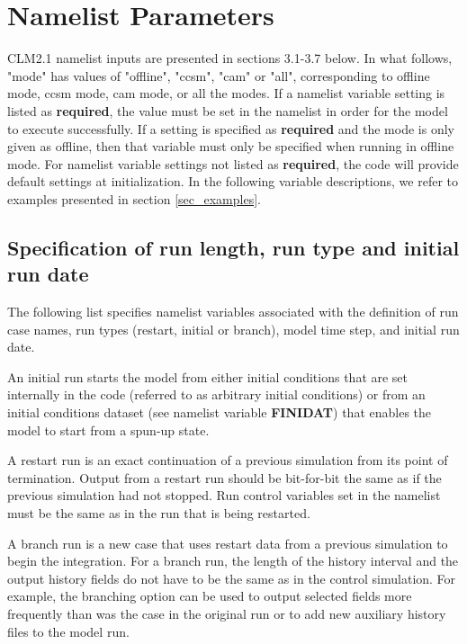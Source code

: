 \section{Namelist Parameters}
\label{sec_namelist}

CLM2.1 namelist inputs are presented in sections 3.1-3.7 below.
In what follows, "mode" has values of "offline", "ccsm", "cam" or "all",
corresponding to offline mode, ccsm mode, cam mode, or all the modes.
If a namelist variable setting is listed as {\bf required}, the
value must be set in the namelist in order for the model to execute
successfully.  If a setting is specified as {\bf required} and the
mode is only given as offline, then that variable must only be
specified when running in offline mode.  For namelist variable
settings not listed as {\bf required}, the code will provide default
settings at initialization.  In the following variable descriptions,
we refer to examples presented in section \ref{sec_examples}.

\subsection {Specification of run length, run type and initial run date}

The following list specifies namelist variables associated with the
definition of run case names, run types (restart, initial or branch),
model time step, and initial run date. 

An initial run starts the model from either initial conditions that
are set internally in the code (referred to as arbitrary initial
conditions) or from an initial conditions dataset (see namelist
variable {\bf FINIDAT}) that enables the model to start from a spun-up
state. 

A restart run is an exact continuation of a previous simulation from
its point of termination.  Output from a restart run should be
bit-for-bit the same as if the previous simulation had not
stopped. Run control variables set in the namelist must be the same as
in the run that is being restarted. 

A branch run is a new case that uses restart data from a previous
simulation to begin the integration. For a branch run, the length of
the history interval and the output history fields do not have to be
the same as in the control simulation. For example, the branching
option can be used to output selected fields more frequently than was
the case in the original run or to add new auxiliary history files to
the model run.

